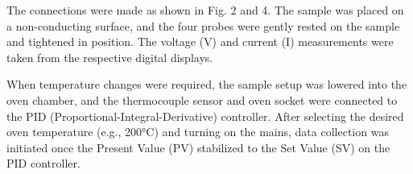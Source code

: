 The connections were made as shown in Fig. 2 and 4. The sample was placed on a non-conducting surface, and the four probes were gently rested on the sample and tightened in position. The voltage (V) and current (I) measurements were taken from the respective digital displays.

When temperature changes were required, the sample setup was lowered into the oven chamber, and the thermocouple sensor and oven socket were connected to the PID (Proportional-Integral-Derivative) controller. After selecting the desired oven temperature (e.g., 200°C) and turning on the mains, data collection was initiated once the Present Value (PV) stabilized to the Set Value (SV) on the PID controller.